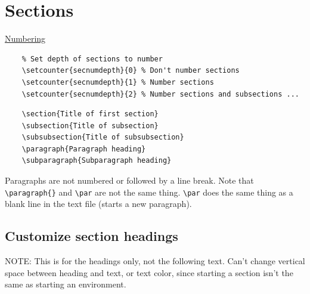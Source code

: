 \documentclass{article}
\begin{document}
\clearpage
\section{Sections}
\begin{minipage}{\textwidth}
\href{https://www.sharelatex.com/learn/Sections_and_chapters#Numbered_and_unnumbered_sections}
    {Numbering}
\end{minipage}

\begin{lstlisting}
    % Set depth of sections to number
    \setcounter{secnumdepth}{0} % Don't number sections
    \setcounter{secnumdepth}{1} % Number sections
    \setcounter{secnumdepth}{2} % Number sections and subsections ...
\end{lstlisting}


\begin{minipage}[t]{0.5\textwidth}
\begin{lstlisting}
    \section{Title of first section}
    \subsection{Title of subsection}
    \subsubsection{Title of subsubsection}
    \paragraph{Paragraph heading}
    \subparagraph{Subparagraph heading}
\end{lstlisting}
\end{minipage}%
\begin{minipage}[t]{0.5\textwidth}
Paragraphs are not numbered or followed by a line break.
Note that \verb|\paragraph{}| and \verb|\par| are not the same thing.
\verb|\par| does the same thing as a blank line in the text file (starts a new paragraph).
\end{minipage}


\subsection{Customize section headings}
NOTE: This is for the headings only, not the following text.
Can't change vertical space between heading and text, or text color, since
starting a section isn't the same as starting an environment.
\end{document}
